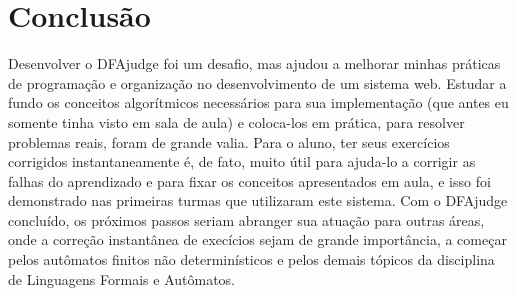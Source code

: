 \documentclass[
	12pt,				%
	openany,
	oneside,
	a4paper,			%
	english,			%
	brazil				%
	]{abntex2}
\begin{document}


 






\chapter[Conclusão]{Conclusão}

  Desenvolver o DFAjudge foi um desafio, mas ajudou a melhorar minhas práticas de programação e organização no desenvolvimento de um sistema web. Estudar a fundo os conceitos algorítmicos necessários para sua implementação (que antes eu somente tinha visto em sala de aula) e coloca-los em prática, para resolver problemas reais, foram de grande valia. Para o aluno, ter seus exercícios corrigidos instantaneamente é, de fato, muito útil para ajuda-lo a corrigir as falhas do aprendizado e para fixar os conceitos apresentados em aula, e isso foi demonstrado nas primeiras turmas que utilizaram este sistema. Com o DFAjudge concluído, os próximos passos seriam abranger sua atuação para outras áreas, onde a correção instantânea de execícios sejam de grande importância, a começar pelos autômatos finitos não determinísticos e pelos demais tópicos da disciplina de Linguagens Formais e Autômatos. 
  
\end{document}
